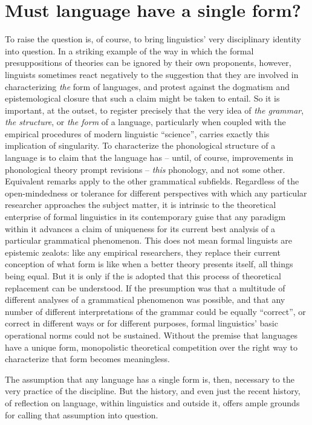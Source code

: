 \documentclass[output=paper]{langscibook}
\begin{document}
\section{Must language have a single form?}
\label{sec:riemer:singleform}

To raise the question is, of course, to bring linguistics' very disciplinary identity into question. In a striking example of the way in which the formal presuppositions of theories can be ignored by their own proponents, however, linguists sometimes react negatively to the suggestion that they are involved in characterizing \emph{the} form of languages, and protest against the dogmatism and epistemological closure that such a claim might be taken to entail. So it is important, at the outset, to register precisely that the very idea of \emph{the grammar}, \emph{the structure}, or \emph{the form} of a language, particularly when coupled with the empirical procedures of modern linguistic ``science'', carries exactly this implication of singularity. To characterize the phonological structure of a language is to claim that the language has -- until, of course, improvements in phonological theory prompt revisions -- \emph{this} phonology, and not some other. Equivalent remarks apply to the other grammatical subfields. Regardless of the open-mindedness or tolerance for different perspectives with which any particular researcher approaches the subject matter, it is intrinsic to the theoretical enterprise of formal linguistics in its contemporary guise that any paradigm within it advances a claim of uniqueness for its current best analysis of a particular grammatical phenomenon. This does not mean formal linguists are epistemic zealots: like any empirical researchers, they replace their current conception of what form is like when a better theory presents itself, all things being equal. But it is only if the  is adopted that this process of theoretical replacement can be understood. If the presumption was that a multitude of different analyses of a grammatical phenomenon was possible, and that any number of different interpretations of the grammar could be equally ``correct'', or correct in different ways or for different purposes, formal linguistics' basic operational norms could not be sustained. Without the premise that languages have a unique form, monopolistic theoretical competition over the right way to characterize that form becomes meaningless.

The assumption that any language has a single form is, then, necessary to the very practice of the discipline. But the history, and even just the recent history, of reflection on language, within linguistics and outside it, offers ample grounds for calling that assumption into question.
\end{document}
